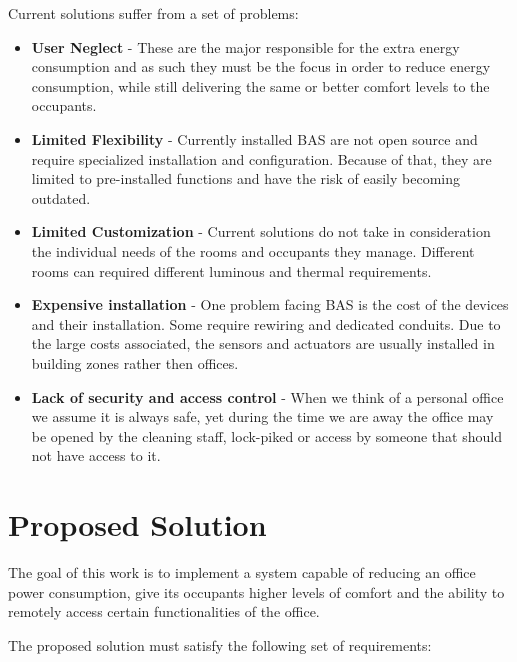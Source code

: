 Current solutions suffer from a set of problems:
\begin{itemize}
\item \textbf{User Neglect} - These are the major responsible for the extra energy consumption and as such they must be the focus in order to reduce energy consumption, while still delivering the same or better comfort levels to the occupants.
\item \textbf{Limited Flexibility} - Currently installed BAS are not open source and require specialized installation and configuration. Because of that, they are limited to pre-installed functions and have the risk of easily becoming outdated.
\item \textbf{Limited Customization} - Current solutions do not take in consideration the individual needs of the rooms and occupants they manage. Different rooms can required different luminous and thermal requirements. 
\item \textbf{Expensive installation} - One problem facing BAS is the cost of the devices and their installation. Some require rewiring  and dedicated conduits. Due to the large costs associated, the sensors and actuators are usually installed in building zones rather then offices.
\item \textbf{Lack of security and access control} - When we think of a personal office we assume it is always safe, yet during the time we are away the office may be opened by the cleaning staff, lock-piked or access by someone that should not have access to it.  
\end{itemize}



\section{Proposed Solution}
\label{section:proposed}

The goal of this work is to implement a system capable of reducing an office power consumption, give its occupants higher levels of comfort and the ability to remotely access certain functionalities of the office.


The proposed solution must satisfy the following set of requirements:

